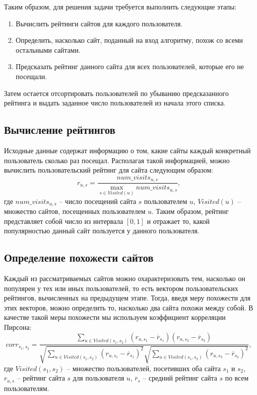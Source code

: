 \documentclass[12pt,a4paper]{report}
\newcommand*\mean[1]{\overline{#1}}
\begin{document}
Таким образом, для решения задачи требуется выполнить следующие этапы:
\begin{enumerate}
\setlength\itemsep{0em}
\item Вычислить рейтинги сайтов для каждого пользователя.
\item Определить, насколько сайт, поданный на вход алгоритму, похож со всеми остальными сайтами.
\item Предсказать рейтинг данного сайта для всех пользователей, которые его не посещали.
\end{enumerate}
Затем остается отсортировать пользователей по убыванию предсказанного рейтинга и выдать заданное число пользователей из начала этого списка.

\subsection{Вычисление рейтингов} 

Исходные данные содержат информацию о том, какие сайты каждый конкретный пользователь сколько раз посещал. Располагая такой информацией, можно вычислить пользовательский рейтинг для сайта следующим образом:
\begin{equation}
r_{u,s} = \frac{num\_visits_{u,s}}{  \max\limits_{s \in Visited(u)} num\_visits_{u,s}} ,
\end{equation}
где $num\_visits_{u,s}$ -- число посещений сайта $s$ пользователем $u$, $Visited(u)$ -- множество сайтов, посещенных пользователем $u$. Таким образом, рейтинг представляет собой число из интервала $[0,1]$ и отражает то, какой популярностью данный сайт пользуется у данного пользователя.

\subsection{Определение похожести сайтов} 

Каждый из рассматриваемых сайтов можно охарактеризовать тем, насколько он популярен у тех или иных пользователей, то есть вектором пользовательских рейтингов, вычисленных на предыдущем этапе. Тогда, введя меру похожести для этих векторов, можно определить то, насколько два сайта похожи между собой. В качестве такой меры похожести мы используем коэффициент корреляции Пирсона: 
\begin{equation}
corr_{s_1, s_2} = \frac{ \sum\limits_{u \in Visited(s_1, s_2)} (r_{u,s_1} -  \mean{r}_{s_1}) (r_{u,s_2} -  \mean{r}_{s_2}) }
{ \sqrt{ \sum\limits_{u \in Visited(s_1, s_2)} (r_{u,s_1} -  \mean{r}_{s_1})^2 } \sqrt { \sum\limits_{u \in Visited(s_1, s_2)} (r_{u,s_2} -  \mean{r}_{s_2})^2 } },
\end{equation}
где $Visited(s_1, s_2)$ -- множество пользователей, посетивших оба сайта $s_1$ и $s_2$, $r_{u,s}$ -- рейтинг сайта $s$ для пользователя $u$, $\mean{r}_{s}$ -- средний рейтинг сайта $s$ по всем пользователям.
\end{document}
